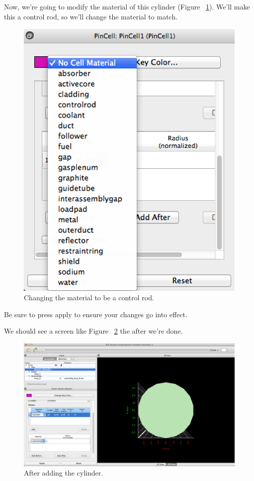 Now, we're going to modify the material of this cylinder (Figure ~\ref{fig:Hex13}).  We'll make this a control rod, so we'll change the material to match.

\begin{figure}[H]
	\begin{center}
		\includegraphics[width=0.5\linewidth]{Images/hex-change-material.png}
		\caption{Changing the material to be a control rod.}
		\label{fig:Hex13}
	\end{center}
\end{figure}

Be sure to press apply to ensure your changes go into effect.

We should see a screen like Figure ~\ref{fig:Hex14} the after we're done.

\begin{figure}[H]
	\begin{center}
		\includegraphics[width=0.85\linewidth]{Images/hex-final-pin.png}
		\caption{After adding the cylinder.}
		\label{fig:Hex14}
	\end{center}
\end{figure}

